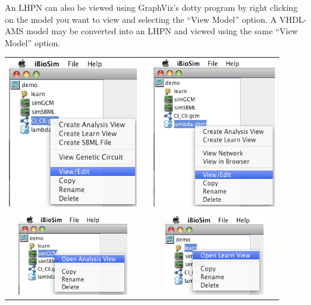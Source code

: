 \documentclass[titlepage,11pt]{article}
\begin{document}
\noindent
An LHPN can also be viewed using 
GraphViz's
dotty program  by right clicking on the model you want to view and
selecting the ``View Model'' option. A VHDL-AMS model may be converted into an
LHPN and viewed using the same ``View Model'' option.

\begin{center}
\begin{tabular}{ccc}
\includegraphics[height=65mm]{screenshots/modGCM} & &
\includegraphics[height=65mm]{screenshots/modSBML} \\ \\
\includegraphics[height=35mm]{screenshots/modAnalysis} & &
\includegraphics[height=35mm]{screenshots/modLearn}
\end{tabular}
\end{center}
\end{document}
